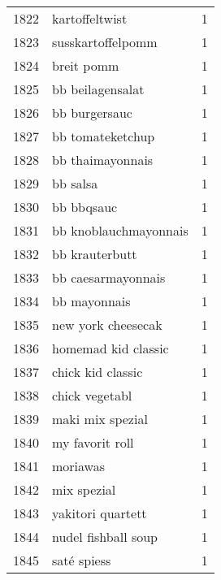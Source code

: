\begin{tabular}{llr}
1822 &                                     kartoffeltwist &      1 \\
1823 &                                  susskartoffelpomm &      1 \\
1824 &                                         breit pomm &      1 \\
1825 &                                   bb beilagensalat &      1 \\
1826 &                                      bb burgersauc &      1 \\
1827 &                                   bb tomateketchup &      1 \\
1828 &                                   bb thaimayonnais &      1 \\
1829 &                                           bb salsa &      1 \\
1830 &                                         bb bbqsauc &      1 \\
1831 &                              bb knoblauchmayonnais &      1 \\
1832 &                                     bb krauterbutt &      1 \\
1833 &                                 bb caesarmayonnais &      1 \\
1834 &                                       bb mayonnais &      1 \\
1835 &                                 new york cheesecak &      1 \\
1836 &                                homemad kid classic &      1 \\
1837 &                                  chick kid classic &      1 \\
1838 &                                     chick vegetabl &      1 \\
1839 &                                   maki mix spezial &      1 \\
1840 &                                    my favorit roll &      1 \\
1841 &                                           moriawas &      1 \\
1842 &                                        mix spezial &      1 \\
1843 &                                  yakitori quartett &      1 \\
1844 &                                nudel fishball soup &      1 \\
1845 &                                        saté spiess &      1 \\

\end{tabular}

